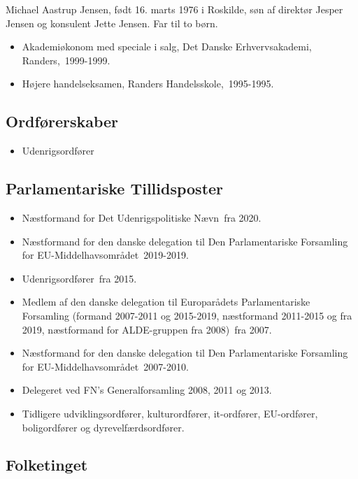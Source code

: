 \documentclass[11pt, a4paper]{awesome-cv}
\begin{document}
\makecvheader[R]
\makelettertitle
\begin{cvletter}
Michael Aastrup Jensen, født 16. marts 1976 i Roskilde, søn af direktør Jesper Jensen og konsulent Jette Jensen. Far til to børn.

\begin{itemize}
\item Akademiøkonom med speciale i salg, Det Danske Erhvervsakademi, Randers, 1999-1999.
\item Højere handelseksamen, Randers Handelsskole, 1995-1995.
\end{itemize}
\subsection*{Ordførerskaber}
\begin{itemize}
\item Udenrigsordfører
\end{itemize}
\subsection*{Parlamentariske Tillidsposter}
\begin{itemize}
\item Næstformand for Det Udenrigspolitiske Nævn fra 2020.
\item Næstformand for den danske delegation til Den Parlamentariske Forsamling for EU-Middelhavsområdet 2019-2019.
\item Udenrigsordfører fra 2015.
\item Medlem af den danske delegation til Europarådets Parlamentariske Forsamling (formand 2007-2011 og 2015-2019, næstformand 2011-2015 og fra 2019, næstformand for ALDE-gruppen fra 2008) fra 2007.
\item Næstformand for den danske delegation til Den Parlamentariske Forsamling for EU-Middelhavsområdet 2007-2010.
\item Delegeret ved FN's Generalforsamling 2008, 2011 og 2013.
\item Tidligere udviklingsordfører, kulturordfører, it-ordfører, EU-ordfører, boligordfører og dyrevelfærdsordfører.
\end{itemize}
\subsection*{Folketinget}

\end{cvletter}
\end{document}
